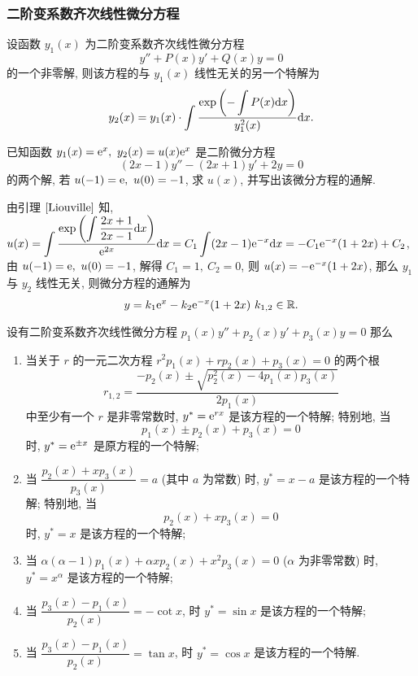 \subsubsection{二阶变系数齐次线性微分方程}

\begin{lemma}[Liouville 引理]
    \label{Liouville}设函数 $y_1(x)$ 为二阶变系数齐次线性微分方程 $$y''+P(x)y'+Q(x)y=0$$
    的一个非零解, 则该方程的与 $y_1(x)$ 线性无关的另一个特解为
    $$y_2(x)=y_1(x)\cdot\int\dfrac{\exp\qty(-\displaystyle\int P(x)\dd x)}{y_1^2(x)}\dd x.$$
\end{lemma}

\begin{example}[2016 数二]
    已知函数 $y_1(x)=\mathrm{e} ^x,~y_2(x)=u(x)\mathrm{e} ^x$ 是二阶微分方程 $$(2x-1)y''-(2x+1)y'+2y=0$$ 的两个解,
    若 $u(-1)=\mathrm{e} ,~u(0)=-1$, 求 $u(x)$, 并写出该微分方程的通解.
\end{example}
\begin{solution}
    由引理 $\ref{Liouville}$ 知, $u(x)=\displaystyle\int\dfrac{\exp\qty(\displaystyle\int\dfrac{2x+1}{2x-1}\dd x)}{\mathrm{e} ^{2x}}\dd x=C_1\int(2x-1)\mathrm{e} ^{-x}\dd x=-C_1\mathrm{e} ^{-x}(1+2x)+C_2$,
    由 $u(-1)=\mathrm{e} ,~u(0)=-1$, 解得 $C_1=1,~C_2=0$, 则 $u(x)=-\mathrm{e} ^{-x}(1+2x)$, 那么 $y_1$ 与 $y_2$ 线性无关, 则微分方程的通解为
    $$y=k_1\mathrm{e} ^x-k_2\mathrm{e} ^{-x}(1+2x)~  k_{1,2}\in\mathbb{R}.$$
\end{solution}

\begin{theorem}
    设有二阶变系数齐次线性微分方程 $p_1(x)y''+p_2(x)y'+p_3(x)y=0$ 那么 \label{erjiebianxis}
    \begin{enumerate}[label=(\arabic{*})]
        \item 当关于 $r$ 的一元二次方程 $r^2p_1(x)+rp_2(x)+p_3(x)=0$ 的两个根
              $$r_{1,2}=\dfrac{-p_2(x)\pm\sqrt{p_2^2(x)-4p_1(x)p_3(x)}}{2p_1(x)}$$
              中至少有一个 $r$ 是非零常数时, $y^*=\mathrm{e} ^{rx}$ 是该方程的一个特解;
              特别地, 当 $$p_1(x)\pm p_2(x)+p_3(x)=0$$
              时, $y^*=\mathrm{e} ^{\pm x}$ 是原方程的一个特解;
        \item 当 $\dfrac{p_2(x)+xp_3(x)}{p_3(x)}=a$ (其中 $a$ 为常数) 时,
              $y^*=x-a$ 是该方程的一个特解; 特别地, 当 $$p_2(x)+xp_3(x)=0$$ 时,
              $y^*=x$ 是该方程的一个特解;
        \item 当 $\alpha(\alpha-1)p_1(x)+\alpha xp_2(x)+x^2p_3(x)=0$ ($\alpha$ 为非零常数) 时,
              $y^*=x^\alpha$ 是该方程的一个特解;
        \item 当 $\dfrac{p_3(x)-p_1(x)}{p_2(x)}=-\cot x$, 时 $y^*=\sin x$ 是该方程的一个特解;
        \item 当 $\dfrac{p_3(x)-p_1(x)}{p_2(x)}=\tan x$, 时 $y^*=\cos x$ 是该方程的一个特解.
    \end{enumerate}
\end{theorem}

